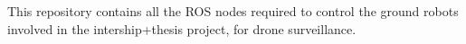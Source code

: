 This repository contains all the ROS nodes required to control the ground robots involved in the intership+thesis project, for drone surveillance. 